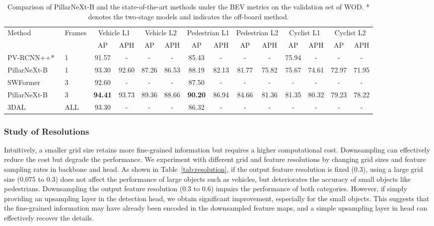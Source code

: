 \documentclass[10pt,twocolumn,letterpaper]{article}
\begin{document}
\begin{table*}[t]
\centering
\setlength{\tabcolsep}{4pt}
\begin{tabular}{l|l|cc|cc|cc|cc|cc|cc}
\hline
\multirow{2}{*}{Method} & \multirow{2}{*}{Frames} & \multicolumn{2}{c|}{Vehicle L1} & \multicolumn{2}{c|}{Vehicle L2} & \multicolumn{2}{c|}{Pedestrian L1} & \multicolumn{2}{c|}{Pedestrian L2} & \multicolumn{2}{c|}{Cyclist L1} & \multicolumn{2}{c}{Cyclist L2} \\  
                        &                         & AP            & APH           & AP            & APH           & AP           & APH         & AP           & APH         & AP           & APH         & AP           & APH         \\ \hline
PV-RCNN++*~\cite{shi2021pv} & 1 & 91.57 & - & - & - & 85.43 & - & - & - & 75.94 & - & - & - \\ 
PillarNeXt-B  & 1 &93.30 & 92.60  & 87.26 & 86.53 & 88.19 & 82.13 & 81.77 & 75.82 & 75.67 & 74.61 & 72.97 & 71.95 \\  \hline
SWFormer~\cite{sun2022swformer} & 3 & 92.60 & - & - & -&  87.50 & - & - & - & - & - & - & - \\ 
PillarNeXt-B &  3 & \textbf{94.41}  & 93.73 & 89.36 & 88.66 & \textbf{90.20} & 86.94 & 84.66 & 81.36 & 81.35 & 80.32 & 79.23 & 78.22 \\ \hline
3DAL~\cite{qi2021offboard} & ALL & 93.30 & - & - & -&  86.32 & - & - & - & - & - & - & - \\ \hline
\end{tabular}
\vspace{-2mm}
\caption{Comparison of PillarNeXt-B and the state-of-the-art methods under the BEV metrics on the validation set of WOD. * denotes the two-stage models and  indicates the off-board method.}
\vspace{-2mm}
\label{exp:waymobev}
\end{table*}

\subsubsection{Study of Resolutions}\label{sec:resolution}
Intuitively, a smaller grid size retains more fine-grained information but requires a higher computational cost. Downsampling can effectively reduce the cost but degrade the performance. We experiment with different grid and feature resolutions by changing grid sizes and feature sampling rates in backbone and head. As shown in Table~\ref{tab:resolution}, if the output feature resolution is fixed (0.3), using a large grid size (0.075 to 0.3) does not affect the performance of large objects such as vehicles, but deteriorates the accuracy of small objects like pedestrians. Downsampling the output feature resolution (0.3 to 0.6) impairs the performance of both categories. However, if simply providing an upsampling layer in the detection head, we obtain significant improvement, especially for the small objects. This suggests that the fine-grained information may have already been encoded in the downsampled feature maps, and a simple upsampling layer in head can effectively recover the details. 
\end{document}
